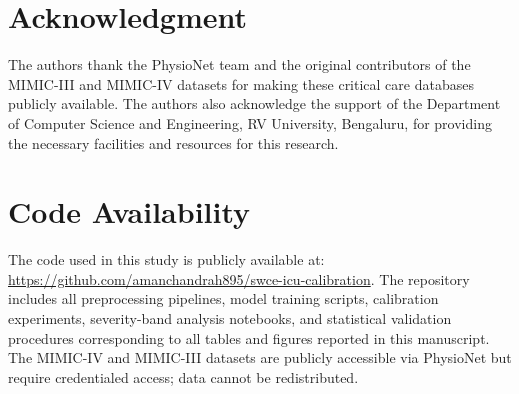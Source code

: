 \documentclass{ieeeaccess}
\begin{document}
\section*{Acknowledgment}

The authors thank the PhysioNet team and the original contributors of the MIMIC-III and MIMIC-IV datasets for making these critical care databases publicly available. The authors also acknowledge the support of the Department of Computer Science and Engineering, RV University, Bengaluru, for providing the necessary facilities and resources for this research.

\section*{Code Availability}
The code used in this study is publicly available at:
\url{https://github.com/amanchandrah895/swce-icu-calibration}.
The repository includes all preprocessing pipelines, model
training scripts, calibration experiments, severity-band
analysis notebooks, and statistical validation procedures
corresponding to all tables and figures reported in this
manuscript. The MIMIC-IV and MIMIC-III datasets are publicly
accessible via PhysioNet but require credentialed access; data cannot be redistributed.
\end{document}
